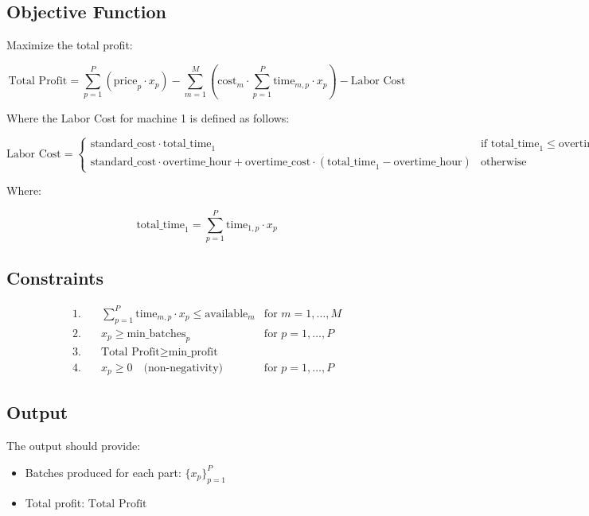 \documentclass{article}
\begin{document}
\subsection*{Objective Function}
Maximize the total profit:

\[
\text{Total Profit} = \sum_{p=1}^{P} \left( \text{price}_{p} \cdot x_{p} \right) - \sum_{m=1}^{M} \left( \text{cost}_{m} \cdot \sum_{p=1}^{P} \text{time}_{m,p} \cdot x_{p} \right) - \text{Labor Cost}
\]

Where the Labor Cost for machine 1 is defined as follows:

\[
\text{Labor Cost} = 
\begin{cases}
\text{standard\_cost} \cdot \text{total\_time}_{1} & \text{if } \text{total\_time}_{1} \leq \text{overtime\_hour} \\
\text{standard\_cost} \cdot \text{overtime\_hour} + \text{overtime\_cost} \cdot (\text{total\_time}_{1} - \text{overtime\_hour}) & \text{otherwise}
\end{cases}
\]

Where:

\[
\text{total\_time}_{1} = \sum_{p=1}^{P} \text{time}_{1,p} \cdot x_{p}
\]

\subsection*{Constraints}
\begin{align*}
1. & \quad \sum_{p=1}^{P} \text{time}_{m,p} \cdot x_{p} \leq \text{available}_{m} & \text{for } m = 1, \ldots, M \\
2. & \quad x_{p} \geq \text{min\_batches}_{p} & \text{for } p = 1, \ldots, P \\
3. & \quad \text{Total Profit} \geq \text{min\_profit} \\
4. & \quad x_{p} \geq 0 \quad \text{(non-negativity)} & \text{for } p = 1, \ldots, P
\end{align*}

\subsection*{Output}
The output should provide:
\begin{itemize}
    \item Batches produced for each part: \( \{ x_{p} \}_{p=1}^{P} \)
    \item Total profit: \( \text{Total Profit} \)
\end{itemize}
\end{document}
